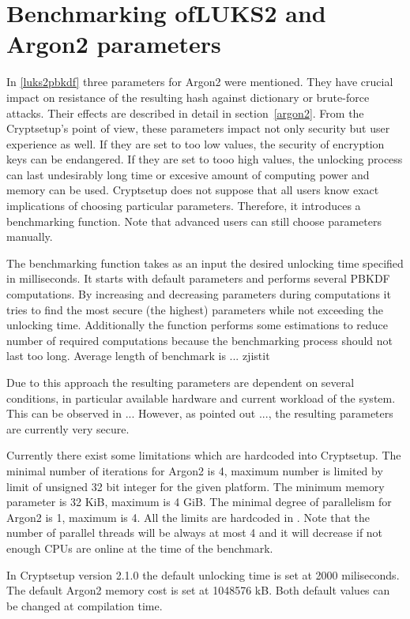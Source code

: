 \documentclass[nolof]{fithesis3}
\begin{document}
\section{Benchmarking ofLUKS2 and Argon2 parameters}
\label{sec:benchmark}
In \ref{luks2pbkdf} three parameters for Argon2 were mentioned. They have crucial impact on resistance of the resulting hash against dictionary or brute-force attacks. Their effects are described in detail in section~\ref{argon2}. From the Cryptsetup's point of view, these parameters impact not only security but  user experience as well. If they are set to too low values, the security of encryption keys can be endangered. If they are set to tooo high values, the unlocking process can last undesirably long time or  excesive amount of computing power and memory can be used. Cryptsetup does not suppose that all users know exact implications of choosing particular parameters. Therefore, it introduces a benchmarking function. Note that advanced users can still choose parameters manually.

The benchmarking function takes as an input the desired unlocking time specified in milliseconds. It starts with default parameters and performs several PBKDF computations. By increasing and decreasing parameters during computations it tries to find the most secure (the highest) parameters while not exceeding the unlocking time. Additionally the function performs some estimations to reduce number of required computations because the benchmarking process should not last too long. Average length of benchmark is ... zjistit

Due to this approach the resulting parameters are dependent on several conditions, in particular available hardware and current workload of the system. This can be observed in ... However, as pointed out ..., the resulting parameters are currently very secure.

Currently there exist some limitations which are hardcoded into Cryptsetup. The minimal number of iterations for Argon2 is 4, maximum number is limited by limit of unsigned 32 bit integer for the given platform. The minimum memory parameter is 32 KiB, maximum is 4 GiB. The minimal degree of parallelism for Argon2 is 1, maximum is 4. All the limits are hardcoded in \parencite{cryptsetupgitpbkdfcheck}. Note that the number of parallel threads will be always at most 4 and it will decrease if not enough CPUs are online at the time of the benchmark.

In Cryptsetup version 2.1.0 the default unlocking time is set at 2000 miliseconds. The default Argon2 memory cost is set at 1048576 kB. Both default values can be changed at compilation time.
\end{document}
